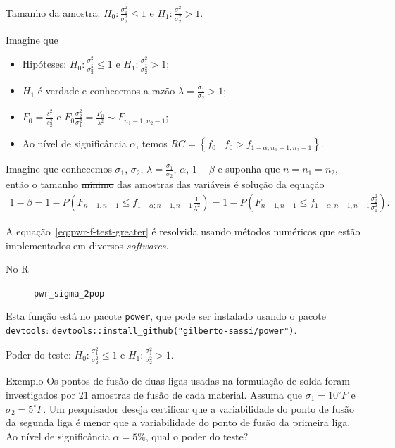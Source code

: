 \documentclass[9pt]{beamer}
\begin{document}
\begin{frame}{Tamanho da amostra: $H_0:\frac{\sigma_1^2}{\sigma_2^2} \leq 1$ e $H_1:\frac{\sigma_1^2}{\sigma_2^2} > 1$.}

\small

Imagine que
\begin{itemize}
\item Hipóteses: $H_0:\frac{\sigma_1^2}{\sigma_2^2} \leq 1$ e $H_1:\frac{\sigma_1^2}{\sigma_2^2} > 1$;
\item $H_1$ é verdade e conhecemos a razão $\lambda=\frac{\sigma_1}{\sigma_2} > 1$;
\item $F_0 = \frac{s_1^2}{s_2^2}$ e $F_0 \frac{\sigma_2^2}{\sigma_1^2} = \frac{F_0}{\lambda^2} \sim F_{n_1-1, n_2-1}$;
\item Ao nível de significância $\alpha$, temos $RC = \left\{ f_0 \mid f_0 > f_{1-\alpha; n_1-1, n_2-1}  \right\}$.
\end{itemize}
\vfill


Imagine que conhecemos $\sigma_1$, $\sigma_2$, $\lambda = \frac{\sigma_1}{\sigma_2}$, $\alpha$, $1-\beta$ e suponha que $n=n_1=n_2$, então o tamanho \sout{mínimo} das amostras das variáveis é solução da equação
\begin{align}\label{eq:pwr-f-test-greater}
1-\beta=1 - P \left(F_{n-1, n-1} \leq f_{1-\alpha; n-1, n-1} \frac{1}{\lambda^2} \right) = 1 - P \left(F_{n-1, n-1} \leq f_{1-\alpha; n-1, n-1} \frac{\sigma_2^2}{\sigma_1^2} \right).
\end{align}

A equação~\eqref{eq:pwr-f-test-greater} é resolvida usando métodos numéricos que estão implementados em diversos \textit{softwares}.
\begin{description}
	\item[No R] \lstinline|pwr_sigma_2pop|
\end{description}
Esta função está no pacote \lstinline|power|, que pode ser instalado usando o pacote \lstinline|devtools|: \lstinline|devtools::install_github("gilberto-sassi/power")|.

\normalsize
\end{frame}

\begin{frame}{Poder do teste: $H_0:\frac{\sigma_1^2}{\sigma_2^2} \leq 1$ e $H_1:\frac{\sigma_1^2}{\sigma_2^2} > 1$.}

\large
\begin{block}{Exemplo}
	Os pontos de fusão de duas ligas usadas na formulação de solda foram investigados por $21$ amostras de fusão de cada material. Assuma que $\sigma_1=10^\circ F$ e $\sigma_2=5^\circ F$. Um pesquisador deseja certificar que a variabilidade do ponto de fusão da segunda liga é menor que a variabilidade do ponto de fusão da primeira liga. Ao nível de significância $\alpha=5\%$, qual o poder do teste?
\end{block}

\normalsize
\end{frame}
\end{document}
